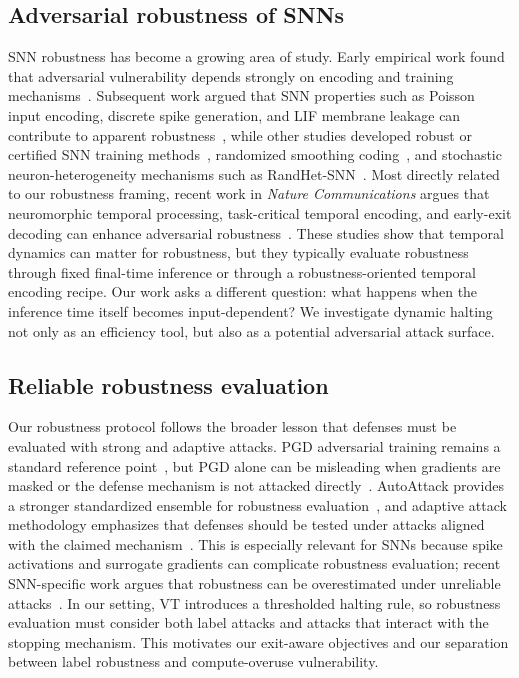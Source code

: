 \documentclass[11pt]{article}
\begin{document}
\subsection{Adversarial robustness of SNNs}
SNN robustness has become a growing area of study. Early empirical work found that adversarial vulnerability depends strongly on encoding and training mechanisms~\cite{sharmin2019comprehensive}. Subsequent work argued that SNN properties such as Poisson input encoding, discrete spike generation, and LIF membrane leakage can contribute to apparent robustness~\cite{sharmin2020inherent}, while other studies developed robust or certified SNN training methods~\cite{liang2022toward}, randomized smoothing coding~\cite{wu2024rscsnn}, and stochastic neuron-heterogeneity mechanisms such as RandHet-SNN~\cite{wang2025randhet}. Most directly related to our robustness framing, recent work in \emph{Nature Communications} argues that neuromorphic temporal processing, task-critical temporal encoding, and early-exit decoding can enhance adversarial robustness~\cite{ding2025neuromorphic}. These studies show that temporal dynamics can matter for robustness, but they typically evaluate robustness through fixed final-time inference or through a robustness-oriented temporal encoding recipe. Our work asks a different question: what happens when the inference time itself becomes input-dependent? We investigate dynamic halting not only as an efficiency tool, but also as a potential adversarial attack surface.

\subsection{Reliable robustness evaluation}
Our robustness protocol follows the broader lesson that defenses must be evaluated with strong and adaptive attacks. PGD adversarial training remains a standard reference point~\cite{madry2018pgd}, but PGD alone can be misleading when gradients are masked or the defense mechanism is not attacked directly~\cite{athalye2018obfuscated}. AutoAttack provides a stronger standardized ensemble for robustness evaluation~\cite{croce2020autoattack}, and adaptive attack methodology emphasizes that defenses should be tested under attacks aligned with the claimed mechanism~\cite{tramer2020adaptive}. This is especially relevant for SNNs because spike activations and surrogate gradients can complicate robustness evaluation; recent SNN-specific work argues that robustness can be overestimated under unreliable attacks~\cite{wang2025reliableeval}. In our setting, VT introduces a thresholded halting rule, so robustness evaluation must consider both label attacks and attacks that interact with the stopping mechanism. This motivates our exit-aware objectives and our separation between label robustness and compute-overuse vulnerability.
\end{document}
